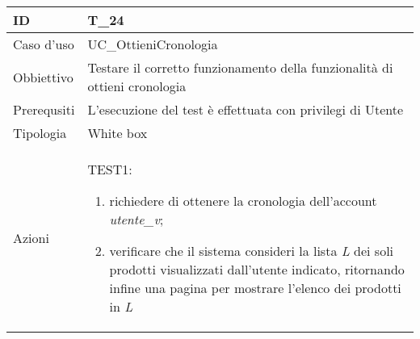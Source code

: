\begin{table}[hb]
    \centering
    \begin{tabular}{ |p{2cm}|p{10cm}|  }
        \hline
        ID          & T\_24                                                                      \\\hline
        Caso d'uso  & UC\_OttieniCronologia                                                      \\\hline
        Obbiettivo  & Testare il corretto funzionamento della funzionalità di ottieni cronologia \\\hline
        Prerequsiti & L'esecuzione del test è effettuata con privilegi di Utente                 \\\hline
        Tipologia   & White box                                                                  \\\hline
        Azioni      &
        TEST1:
        \begin{enumerate}[nosep, topsep=0pt]
            \item richiedere di ottenere la cronologia dell'account \emph{utente\_v};
            \item verificare che il sistema consideri la lista \emph{L} dei soli prodotti visualizzati dall'utente indicato, ritornando infine una pagina per mostrare l'elenco dei prodotti in \emph{L}
        \end{enumerate}
        \\\hline
    \end{tabular}
\end{table}

